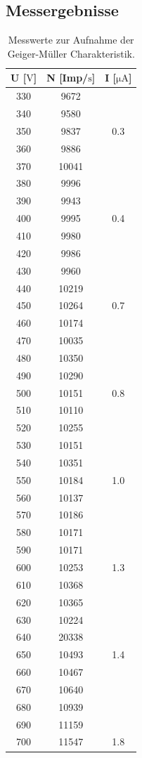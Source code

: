 \subsection{Messergebnisse}
\begin{table}
  \centering
  \caption{Messwerte zur Aufnahme der Geiger-Müller Charakteristik.}
  \label{tab:Messwerte}
  \begin{tabular}{c c c}
      \toprule
      {U [$\si{\volt}$]} & {N [Imp/$\si{\second}$]} & {I [$\si{\micro\ampere}$]}\\
      \midrule
      330& 9672 \\
      340& 9580 \\
      350& 9837& 0.3 \\
      360& 9886\\
      370& 10041\\
      380& 9996 \\
      390& 9943 \\
      400& 9995& 0.4 \\
      410& 9980 \\
      420& 9986 \\
      430& 9960 \\
      440& 10219\\
      450& 10264& 0.7 \\
      460& 10174 \\
      470& 10035 \\
      480& 10350 \\
      490& 10290 \\
      500& 10151& 0.8 \\
      510& 10110 \\
      520& 10255 \\
      530& 10151 \\
      540& 10351 \\
      550& 10184& 1.0 \\
      560& 10137 \\
      570& 10186 \\
      580& 10171 \\
      590& 10171 \\
      600& 10253& 1.3 \\
      610& 10368 \\
      620& 10365 \\
      630& 10224 \\
      640& 20338 \\
      650& 10493& 1.4 \\
      660& 10467\\
      670& 10640\\
      680& 10939\\
      690& 11159\\
      700& 11547& 1.8 \\
      \bottomrule
    \end{tabular}
\end{table}